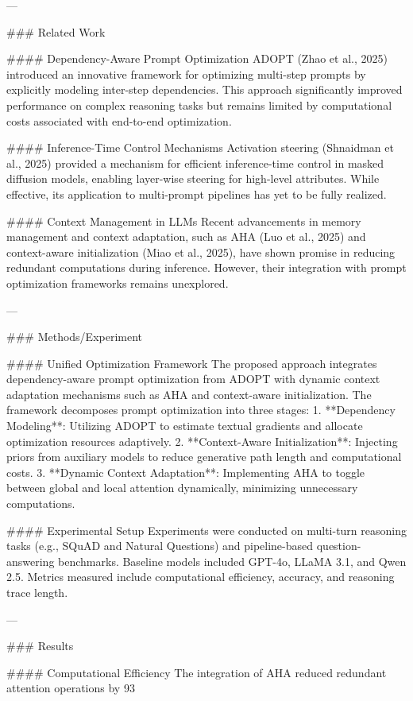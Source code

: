 ---

### Related Work

#### Dependency-Aware Prompt Optimization
ADOPT (Zhao et al., 2025) introduced an innovative framework for optimizing multi-step prompts by explicitly modeling inter-step dependencies. This approach significantly improved performance on complex reasoning tasks but remains limited by computational costs associated with end-to-end optimization.

#### Inference-Time Control Mechanisms
Activation steering (Shnaidman et al., 2025) provided a mechanism for efficient inference-time control in masked diffusion models, enabling layer-wise steering for high-level attributes. While effective, its application to multi-prompt pipelines has yet to be fully realized.

#### Context Management in LLMs
Recent advancements in memory management and context adaptation, such as AHA (Luo et al., 2025) and context-aware initialization (Miao et al., 2025), have shown promise in reducing redundant computations during inference. However, their integration with prompt optimization frameworks remains unexplored.

---

### Methods/Experiment

#### Unified Optimization Framework
The proposed approach integrates dependency-aware prompt optimization from ADOPT with dynamic context adaptation mechanisms such as AHA and context-aware initialization. The framework decomposes prompt optimization into three stages:
1. **Dependency Modeling**: Utilizing ADOPT to estimate textual gradients and allocate optimization resources adaptively.
2. **Context-Aware Initialization**: Injecting priors from auxiliary models to reduce generative path length and computational costs.
3. **Dynamic Context Adaptation**: Implementing AHA to toggle between global and local attention dynamically, minimizing unnecessary computations.

#### Experimental Setup
Experiments were conducted on multi-turn reasoning tasks (e.g., SQuAD and Natural Questions) and pipeline-based question-answering benchmarks. Baseline models included GPT-4o, LLaMA 3.1, and Qwen 2.5. Metrics measured include computational efficiency, accuracy, and reasoning trace length.

---

### Results

#### Computational Efficiency
The integration of AHA reduced redundant attention operations by 93%


